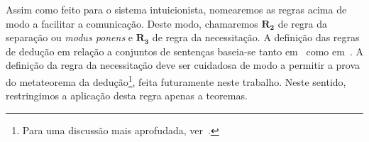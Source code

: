     Assim como feito para o sistema intuicionista, nomearemos as regras acima de modo a facilitar a comunicação.
    Deste modo, chamaremos $\mathbf{R_2}$ de regra da separação ou \emph{modus ponens} e $\mathbf{R_3}$ de regra da necessitação. A definição das regras de dedução em relação a conjuntos de sentenças baseia-se tanto em~\cite{Troelstra} como em~\cite{Hakli}. A definição da regra da necessitação deve ser cuidadosa de modo a permitir a prova do metateorema da dedução\footnote{Para uma discussão mais aprofudada, ver~\cite{Hakli}.}, feita futuramente neste trabalho. Neste sentido, restringimos a aplicação desta regra apenas a teoremas.
